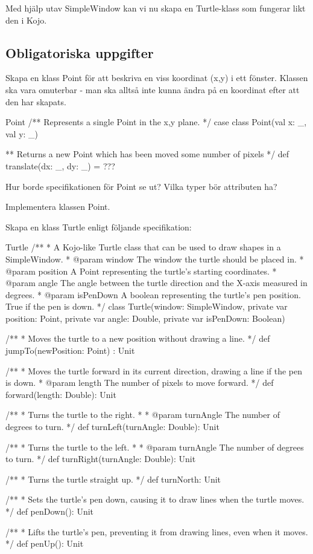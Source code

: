 Med hjälp utav SimpleWindow kan vi nu skapa en Turtle-klass som fungerar likt den i Kojo. 

\subsection{Obligatoriska uppgifter}

\Task Skapa en klass Point för att beskriva en viss koordinat (x,y) i ett fönster. Klassen ska vara omuterbar - man ska alltså inte kunna ändra på en koordinat efter att den har skapats.

\begin{ScalaSpec}{Point}
/** Represents a single Point in the x,y plane. */
case class Point(val x: _, val y: _) {

** Returns a new Point which has been moved some number of pixels */
def translate(dx: _, dy: _) = ???
}
\end{ScalaSpec}

\Subtask Hur borde specifikationen för Point se ut? Vilka typer bör attributen ha?

\Subtask Implementera klassen Point.




\Task Skapa en klass Turtle enligt följande specifikation:

\begin{ScalaSpec}{Turtle}
/**
  * A Kojo-like Turtle class that can be used to draw shapes
    in a SimpleWindow.
  * @param window     The window the turtle should be placed in.
  * @param position   A Point representing the turtle's starting
                      coordinates.
  * @param angle      The angle between the turtle direction and
                      the X-axis measured in degrees.
  * @param isPenDown  A boolean representing the turtle's pen
                      position. True if the pen is down.
  */
class Turtle(window: SimpleWindow, private var position: Point,
      private var angle: Double, private var isPenDown: Boolean) {
  /**
    * Moves the turtle to a new position without drawing a line.
    */
  def jumpTo(newPosition: Point) : Unit

  /**
    * Moves the turtle forward in its current direction, drawing
      a line if the pen is down.
    * @param length The number of pixels to move forward.
    */
  def forward(length: Double): Unit

  /**
    * Turns the turtle to the right.
    *
    * @param turnAngle The number of degrees to turn.
    */
  def turnLeft(turnAngle: Double): Unit

  /**
    * Turns the turtle to the left.
    *
    * @param turnAngle The number of degrees to turn.
    */
  def turnRight(turnAngle: Double): Unit

  /**
    * Turns the turtle straight up.
    */
  def turnNorth: Unit

  /**
    * Sets the turtle's pen down, causing it to draw lines when
      the turtle moves.
    */
  def penDown(): Unit

  /**
    * Lifts the turtle's pen, preventing it from drawing lines,
      even when it moves.
    */
  def penUp(): Unit
}

\end{ScalaSpec}

